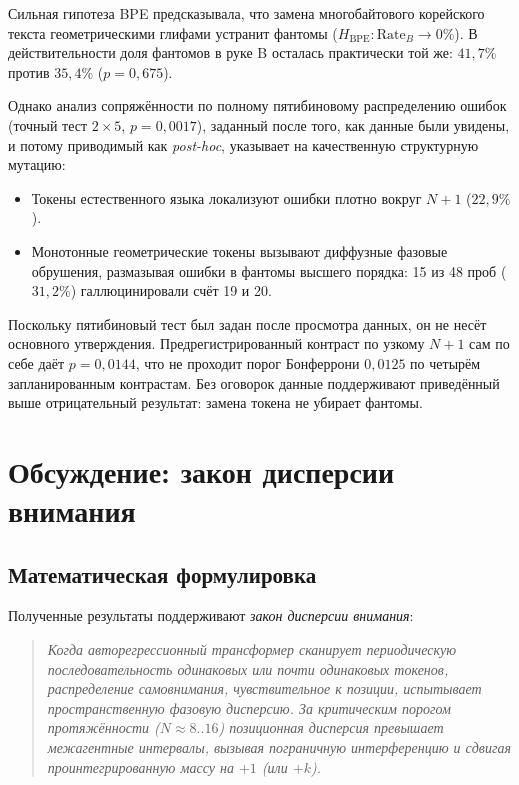 \documentclass[11pt,a4paper]{article}
\begin{document}
Сильная гипотеза BPE предсказывала, что замена многобайтового корейского текста геометрическими глифами устранит фантомы ($H_{\text{BPE}}: \text{Rate}_B \to 0\%$). В действительности доля фантомов в руке B осталась практически той же: \textbf{$41{,}7\%$} против \textbf{$35{,}4\%$} ($p = 0{,}675$).

Однако анализ сопряжённости по полному пятибиновому распределению ошибок (точный тест $2 \times 5$, $p = 0{,}0017$), заданный после того, как данные были увидены, и потому приводимый как \emph{post-hoc}, указывает на качественную структурную мутацию:
\begin{itemize}
    \item Токены естественного языка локализуют ошибки плотно вокруг $N+1$ ($22{,}9\%$).
    \item Монотонные геометрические токены вызывают диффузные фазовые обрушения, размазывая ошибки в фантомы высшего порядка: 15 из 48 проб ($31{,}2\%$) галлюцинировали счёт 19 и 20.
\end{itemize}

Поскольку пятибиновый тест был задан после просмотра данных, он не несёт основного утверждения. Предрегистрированный контраст по узкому $N+1$ сам по себе даёт $p = 0{,}0144$, что не проходит порог Бонферрони $0{,}0125$ по четырём запланированным контрастам.
Без оговорок данные поддерживают приведённый выше отрицательный результат: замена токена не убирает фантомы.

\section{Обсуждение: закон дисперсии внимания}
\label{sec:dispersion}

\subsection{Математическая формулировка}

Полученные результаты поддерживают \textit{закон дисперсии внимания}:
\begin{quote}
\textit{Когда авторегрессионный трансформер сканирует периодическую последовательность одинаковых или почти одинаковых токенов, распределение самовнимания, чувствительное к позиции, испытывает пространственную фазовую дисперсию. За критическим порогом протяжённости ($N \approx 8..16$) позиционная дисперсия превышает межагентные интервалы, вызывая пограничную интерференцию и сдвигая проинтегрированную массу на $+1$ (или $+k$).}
\end{quote}
\end{document}
